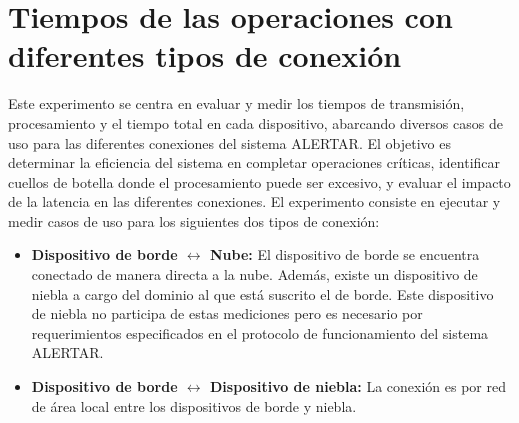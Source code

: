 \section{Tiempos de las operaciones con diferentes tipos de conexión}
\label{sec:tiemposDeLasOps}
Este experimento se centra en evaluar y medir los tiempos de transmisión, procesamiento y el tiempo total en cada dispositivo, abarcando diversos casos de uso para las diferentes conexiones del sistema ALERTAR. El objetivo es determinar la eficiencia del sistema en completar operaciones críticas, identificar cuellos de botella donde el procesamiento puede ser excesivo, y evaluar el impacto de la latencia en las diferentes conexiones. El experimento consiste en ejecutar y medir casos de uso para los siguientes dos tipos de conexión:
\begin{itemize}
    \item \textbf{Dispositivo de borde $\leftrightarrow$ Nube: }El dispositivo de borde se encuentra conectado de manera directa a la nube. Además, existe un dispositivo de niebla a cargo del dominio al que está suscrito el de borde. Este dispositivo de niebla no participa de estas mediciones pero es necesario por requerimientos especificados en el protocolo de funcionamiento del sistema ALERTAR.
    \item \textbf{Dispositivo de borde $\leftrightarrow$ Dispositivo de niebla: }La conexión es por red de área local entre los dispositivos de borde y niebla.
\end{itemize}

